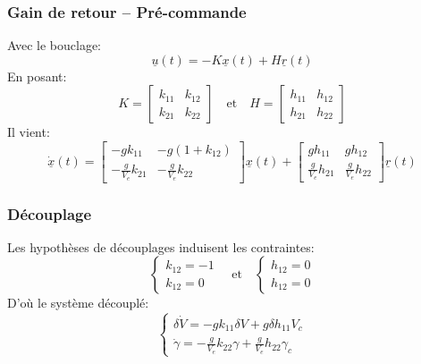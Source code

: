 \documentclass[footheight=2em]{beamer}
\begin{document}
\begin{frame}
    \frametitle{Gain de retour -- Pré-commande} \pause{}
    Avec le bouclage:
    \[
    \underline{u}(t) = -K \underline{x}(t) +
        H \underline{r}(t)
    \] \pause{}
    En posant:
    \[
    K =
    \left[
    \begin{array}{cc}
        k_{11} & k_{12} \\
        k_{21} & k_{22}
    \end{array}
    \right]\quad
    \text{et}\quad
    H =
    \left[
    \begin{array}{cc}
        h_{11} & h_{12} \\
        h_{21} & h_{22}
    \end{array}
    \right]
    \] \pause{}
    Il vient:
    \[
    \underline{\dot{x}}(t)
    =
    \left[
    \begin{array}{cc}
        -g k_{11} & -g (1+k_{12}) \\
        -\frac{g}{V_e} k_{21} & -\frac{g}{V_e} k_{22}
    \end{array}
    \right]
    \underline{x} (t)
    +
    \left[
    \begin{array}{cc}
        g h_{11} & g h_{12} \\
        \frac{g}{V_e} h_{21} & \frac{g}{V_e} h_{22}
    \end{array}
    \right]
    \underline{r} (t)
    \]
\end{frame}


\begin{frame}
    \frametitle{Découplage} \pause{}
    Les hypothèses de découplages induisent les contraintes:
    \[
    \left \{
    \begin{array}{l}
        k_{12} = -1 \\
        k_{12} = 0
    \end{array}
    \right.\quad
    \text{et}\quad
    \left \{
    \begin{array}{l}
        h_{12} = 0 \\
        h_{12} = 0
    \end{array}
    \right.
    \]
    \pause{}
    D'où le système découplé:
    \[
    \left \{
    \begin{array}{l}
        \delta \dot{V} = -g k_{11} \delta V + g \delta h_{11} V_c \\
        \dot{\gamma} = -\frac{g}{V_e} k_{22} \gamma + \frac{g}{V_e} h_{22} \gamma_c
    \end{array}
    \right.
    \]
\end{frame}
\end{document}
